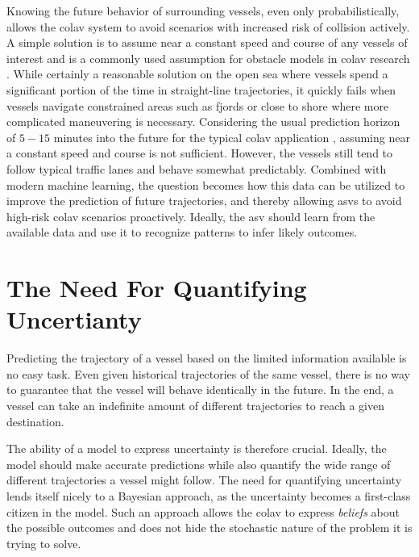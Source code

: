 Knowing the future behavior of surrounding vessels, even only probabilistically, allows the \acrshort{colav} system to avoid scenarios with increased risk of collision actively. A simple solution is to assume near a constant speed and course of any vessels of interest and is a commonly used assumption for obstacle models in \acrshort{colav} research \cite{kuwata, }. While certainly a reasonable solution on the open sea where vessels spend a significant portion of the time in straight-line trajectories, it quickly fails when vessels navigate constrained areas such as fjords or close to shore where more complicated maneuvering is necessary. Considering the usual prediction horizon of $5-15$ minutes into the future for the typical \acrshort{colav} application \cite{dalsnes}, assuming near a constant speed and course is not sufficient. 
 However, the vessels still tend to follow typical traffic lanes and behave somewhat predictably. Combined with modern machine learning, the question becomes how this data can be utilized to improve the prediction of future trajectories, and thereby allowing \acrshort{asv}s to avoid high-risk \acrshort{colav} scenarios proactively. Ideally, the \acrshort{asv} should learn from the available data and use it to recognize patterns to infer likely outcomes.

\section{The Need For Quantifying Uncertianty}
Predicting the trajectory of a vessel based on the limited information available is no easy task. Even given historical trajectories of the same vessel, there is no way to guarantee that the vessel will behave identically in the future. In the end, a vessel can take an indefinite amount of different trajectories to reach a given destination. 

The ability of a model to express uncertainty is therefore crucial. Ideally, the model should make accurate predictions while also quantify the wide range of different trajectories a vessel might follow. The need for quantifying uncertainty lends itself nicely to a Bayesian approach, as the uncertainty becomes a first-class citizen in the model. Such an approach allows the \acrshort{colav} to express \textit{beliefs} about the possible outcomes and does not hide the stochastic nature of the problem it is trying to solve. 

